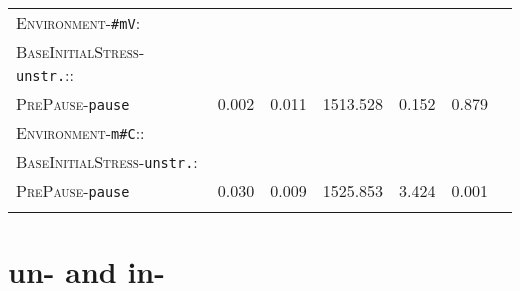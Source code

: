 \begin{table}
{\begin{tabular} {lrrrrrr}
		\textsc{Environment}-\texttt{\#mV}:&&&&&\\
		\textsc{BaseInitialStress}-\texttt{unstr.}::&&&&&\\
		\textsc{PrePause}-\texttt{pause} & \color{lsLightGray}0.002 & \color{lsLightGray}0.011 & \color{lsLightGray}1513.528 & \color{lsLightGray}0.152 &\color{lsLightGray}0.879 \\ 
		\textsc{Environment}-\texttt{m\#C}::&&&&&\\
		\textsc{BaseInitialStress}-\texttt{unstr.}:&&&&&\\
		\textsc{PrePause}-\texttt{pause }& 0.030 & 0.009 & 1525.853 & 3.424 & 0.001 \\ 
		\lspbottomrule 
			\end{tabular}
}


\end{table}
\clearpage

\section{{un-} and in-}


